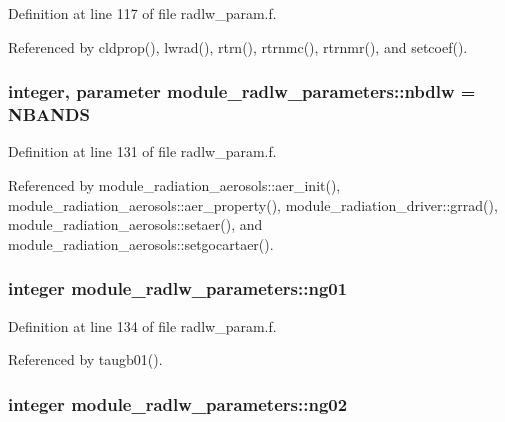 Definition at line 117 of file radlw\+\_\+param.\+f.



Referenced by cldprop(), lwrad(), rtrn(), rtrnmc(), rtrnmr(), and setcoef().

\subsubsection[{\texorpdfstring{nbdlw}{nbdlw}}]{\setlength{\rightskip}{0pt plus 5cm}integer, parameter module\+\_\+radlw\+\_\+parameters\+::nbdlw = N\+B\+A\+N\+DS}\hypertarget{group__module__radlw__main_ga39a115a97296886b2e6e37b220e942c7}{}\label{group__module__radlw__main_ga39a115a97296886b2e6e37b220e942c7}


Definition at line 131 of file radlw\+\_\+param.\+f.



Referenced by module\+\_\+radiation\+\_\+aerosols\+::aer\+\_\+init(), module\+\_\+radiation\+\_\+aerosols\+::aer\+\_\+property(), module\+\_\+radiation\+\_\+driver\+::grrad(), module\+\_\+radiation\+\_\+aerosols\+::setaer(), and module\+\_\+radiation\+\_\+aerosols\+::setgocartaer().

\subsubsection[{\texorpdfstring{ng01}{ng01}}]{\setlength{\rightskip}{0pt plus 5cm}integer module\+\_\+radlw\+\_\+parameters\+::ng01}\hypertarget{group__module__radlw__main_ga54dc7913677d754af2b7ece9732b1280}{}\label{group__module__radlw__main_ga54dc7913677d754af2b7ece9732b1280}


Definition at line 134 of file radlw\+\_\+param.\+f.



Referenced by taugb01().

\subsubsection[{\texorpdfstring{ng02}{ng02}}]{\setlength{\rightskip}{0pt plus 5cm}integer module\+\_\+radlw\+\_\+parameters\+::ng02}\hypertarget{group__module__radlw__main_gaed66d66a4da744d27c13b57b41ba78c3}{}\label{group__module__radlw__main_gaed66d66a4da744d27c13b57b41ba78c3}


